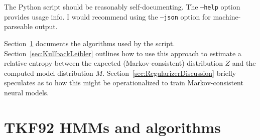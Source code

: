 \documentclass{article}
\newcommand\seclabel[1]{\label{sec:#1}}
\newcommand\secref[1]{Section~\ref{sec:#1}}
\begin{document}
The Python script should be reasonably self-documenting. The {\tt --help} option provides usage info.
I would recommend using the {\tt --json} option for machine-parseable output.

\secref{Algorithms} documents the algorithms used by the script.
\secref{KullbackLeibler} outlines how to use this approach to estimate a relative entropy between
the expected (Markov-consistent) distribution $Z$ and the computed model distribution $M$.
\secref{RegularizerDiscussion} briefly speculates as to how this might be operationalized to train Markov-consistent neural models.


\section{TKF92 HMMs and algorithms}
\seclabel{Algorithms}

\newcommand\mat{{\tt M}}
\newcommand\ins{{\tt I}}
\newcommand\del{{\tt D}}
\newcommand\nul{{\tt N}}
\newcommand\wait{{\tt W}}
\newcommand\sta{{\tt S}}
\newcommand\fin{{\tt E}}

\newcommand\smide{\{ \sta, \mat, \ins, \del, \fin \}}

\newcommand\insrate{\lambda}
\newcommand\delrate{\mu}
\newcommand\fragext{r}

\newcommand\submat{{\bf Q}}
\newcommand\eqm{\pi}

\newcommand\params{\theta}

\newcommand\jointpairmatrix{{\tt JointPairMatrix}}
\newcommand\jointpairhmm{{\tt JointPairHMM}}
\newcommand\conditionalpairmatrix{{\tt ConditionalPairMatrix}}
\newcommand\conditionalpairhmm{{\tt ConditionalPairHMM}}
\newcommand\triadhmm{{\tt TriadHMM}}

\newcommand\triadstart{{\tt SS}}
\newcommand\stains{{\tt sI}}
\newcommand\matmat{{\tt MM}}
\newcommand\matins{{\tt mI}}
\newcommand\matdel{{\tt MD}}
\newcommand\insmat{{\tt IM}}
\newcommand\insins{{\tt iI}}
\newcommand\insdel{{\tt ID}}
\newcommand\delsta{{\tt Ds}}
\newcommand\delmat{{\tt Dm}}
\newcommand\delins{{\tt Di}}
\newcommand\deldel{{\tt Dd}}
\newcommand\triadend{{\tt EE}}

\newcommand\ymx{{\bf y}}
\newcommand\zmx{{\bf z}}
\newcommand\ty[1]{y_{#1}}
\newcommand\tz[1]{z_{#1}}

\newcommand\states{\Phi}
\newcommand\alphabet{\Omega}
\newcommand\statetype{\tau}

\newcommand\statepath{\phi}
\newcommand\startstate{\statepath^{(\sta)}}
\newcommand\finstate{\statepath^{(\fin)}}
\end{document}
